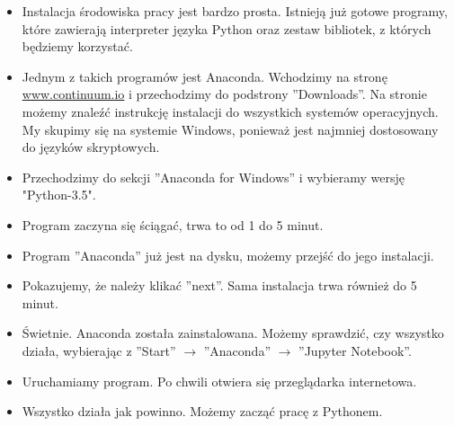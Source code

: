 \documentclass{mwart}
\begin{document}
\begin{itemize}
  \item Instalacja środowiska pracy jest bardzo prosta. Istnieją już gotowe programy,
    które zawierają interpreter języka Python oraz zestaw bibliotek, z których będziemy
    korzystać.
  \item Jednym z takich programów jest Anaconda. Wchodzimy na stronę
    \url{www.continuum.io} i przechodzimy do podstrony ''Downloads''. Na stronie możemy
    znaleźć instrukcję instalacji do wszystkich systemów operacyjnych. My skupimy się
    na systemie Windows, ponieważ jest najmniej dostosowany do języków skryptowych.
  \item Przechodzimy do sekcji ''Anaconda for Windows'' i wybieramy wersję "Python-3.5".
  \item Program zaczyna się ściągać, trwa to od 1 do 5 minut.
  \item Program ''Anaconda'' już jest na dysku, możemy przejść do jego instalacji.
  \item Pokazujemy, że należy klikać ''next''. Sama instalacja trwa również do 5 minut.
  \item Świetnie. Anaconda została zainstalowana. Możemy sprawdzić, czy wszystko działa,
    wybierając z ''Start'' $\rightarrow$ ''Anaconda'' $\rightarrow$ ''Jupyter Notebook''.
  \item Uruchamiamy program. Po chwili otwiera się przeglądarka internetowa.
  \item Wszystko działa jak powinno. Możemy zacząć pracę z Pythonem.
\end{itemize}
\end{document}
